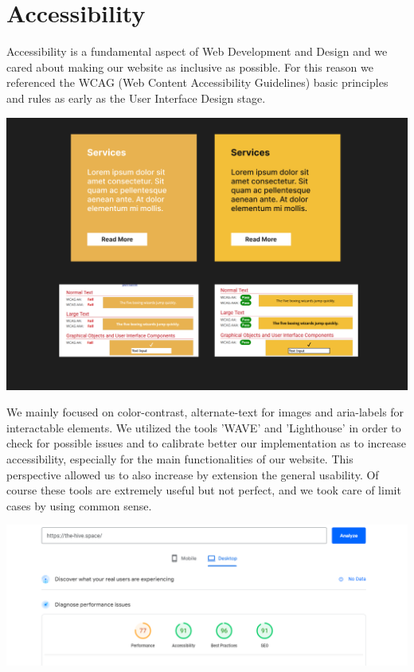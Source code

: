\section{Accessibility}
Accessibility is a fundamental aspect of Web Development and Design and we cared about making our
website as inclusive as possible. For this reason we referenced the WCAG (Web Content Accessibility Guidelines) basic principles and rules
as early as the User Interface Design stage.

\begin{center}
    \includegraphics[width=0.75\linewidth]{img/color-contrast-check.png}
\end{center}

\vspace{1em}
We mainly focused on color-contrast, alternate-text for images and aria-labels for interactable elements.
We utilized the tools 'WAVE' and 'Lighthouse' in order to check for possible issues and to calibrate better our
implementation as to increase accessibility, especially for the main functionalities of our website.
This perspective allowed us to also increase by extension the general usability.
Of course these tools are extremely useful but not perfect, and we took care of limit cases by using common sense.
\vspace{1em}

\begin{center}
    \includegraphics[width=0.75\linewidth]{img/lighthouse-result.png}
\end{center}

